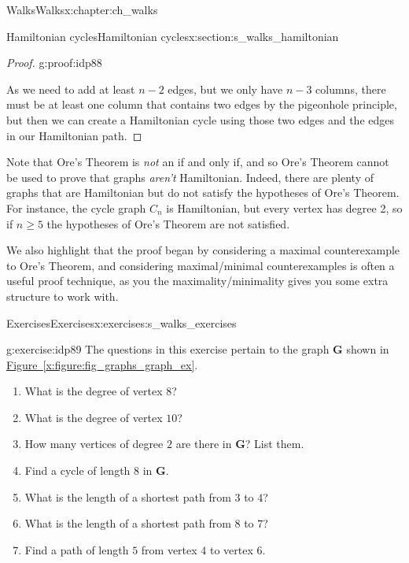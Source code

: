 \documentclass[oneside,10pt,]{book}
\newcommand{\xreffont}{\relax}
\numberwithin{equation}{section}
\newcommand{\bfG}{\mathbf{G}}
\begin{document}
\begin{chapterptx}{Walks}{}{Walks}{}{}{x:chapter:ch_walks}
\begin{sectionptx}{Hamiltonian cycles}{}{Hamiltonian cycles}{}{}{x:section:s_walks_hamiltonian}
\begin{proof}{}{g:proof:idp88}
\par
As we need to add at least \(n-2\) edges, but we only have \(n-3\) columns, there must be at least one column that contains two edges by the pigeonhole principle, but then we can create a Hamiltonian cycle using those two edges and the edges in our Hamiltonian path.%
\end{proof}
Note that Ore's Theorem is \emph{not} an if and only if, and so Ore's Theorem cannot be used to prove that graphs \emph{aren't} Hamiltonian.  Indeed, there are plenty of graphs that are Hamiltonian but do not satisfy the hypotheses of Ore's Theorem.  For instance, the cycle graph \(C_n\) is Hamiltonian, but every vertex has degree 2, so if \(n\geq 5\) the hypotheses of Ore's Theorem are not satisfied.%
\par
We also highlight that the proof began by considering a maximal counterexample to Ore's Theorem, and considering maximal\slash{}minimal counterexamples is often a useful proof technique, as you the maximality\slash{}minimality gives you some extra structure to work with.%
\end{sectionptx}
%
%
\typeout{************************************************}
\typeout{************************************************}
%
\begin{exercises-section}{Exercises}{}{Exercises}{}{}{x:exercises:s_walks_exercises}
\begin{divisionexercise}{1}{}{}{g:exercise:idp89}%
The questions in this exercise pertain to the graph \(\bfG\) shown in \hyperref[x:figure:fig_graphs_graph_ex]{Figure~{\xreffont\ref{x:figure:fig_graphs_graph_ex}}}.%
\begin{sidebyside}{2}{0.0125}{0.0125}{0.025}%
\begin{sbspanel}{0.6}%
%
\begin{enumerate}[label=(\alph*)]
\item{}What is the degree of vertex \(8\)?%
\item{}What is the degree of vertex \(10\)?%
\item{}How many vertices of degree \(2\) are there in \(\bfG\)? List them.%
\item{}Find a cycle of length \(8\) in \(\bfG\).%
\item{}What is the length of a shortest path from \(3\) to \(4\)?%
\item{}What is the length of a shortest path from \(8\) to \(7\)?%
\item{}Find a path of length \(5\) from vertex \(4\) to vertex \(6\).%

\end{enumerate}
\end{sbspanel}
\end{sidebyside}
\end{divisionexercise}
\end{exercises-section}
\end{chapterptx}
\end{document}
